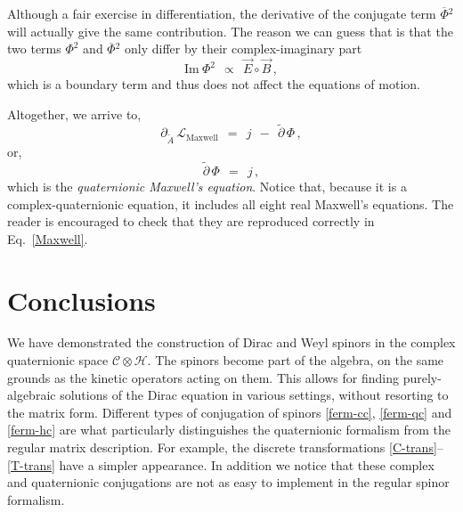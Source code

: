 \documentclass[epsfig,12pt]{article}
\newcommand{\cell}{{\mathcal L}}
\newcommand{\p}{\partial}
\newcommand{\wt}{\widetilde}
\newcommand{\ov}{\overline}
\newcommand{\cC}{\mathcal{C}}
\newcommand{\cH}{\mathcal{H}}
\begin{document}
	Although a fair exercise in differentiation, the derivative of the conjugate term $ \ov\Phi{}^2 $
	will actually give the same contribution.
	The reason we can guess that is that the two terms $ \Phi^2 $ and $ \ov\Phi{}^2 $
	only differ by their complex-imaginary part
\begin{equation}
	\text{Im}~\Phi^2	~~\propto~~	\vec E \circ \vec B\,,
\end{equation}
	which is a boundary term and thus does not affect the equations of motion.

	Altogether, we arrive to,
\begin{equation}
	\p_{\wt A}\, \cell_\text{Maxwell}	~~=~~	j  ~~-~~  \wt\p\,\Phi\,,
\end{equation}
	or,
\begin{equation}
\label{Maxwell}
	\wt\p\,\Phi	~~=~~	j\,,
\end{equation}
	which is the \emph{quaternionic Maxwell's equation}.
	Notice that, because it is a complex-quaternionic equation, 
	it includes all eight real Maxwell's equations.
	The reader is encouraged to check that they are reproduced correctly in Eq.~\eqref{Maxwell}.




\section{Conclusions}

	We have demonstrated the construction of Dirac and Weyl spinors in the complex quaternionic
	space $ \cC \otimes \cH $.
	The spinors become part of the algebra, on the same grounds as the kinetic operators acting on them.
	This allows for finding purely-algebraic solutions of the Dirac equation in various settings,
	without resorting to the matrix form.
	Different types of conjugation of spinors \eqref{ferm-cc}, \eqref{ferm-qc} and \eqref{ferm-hc}
	are what particularly distinguishes the quaternionic formalism from the regular matrix description.
	For example, the discrete transformations \eqref{C-trans}--\eqref{T-trans} have a simpler
	appearance.
	In addition we notice that these complex and quaternionic conjugations are not as easy to implement
	in the regular spinor formalism.
\end{document}

